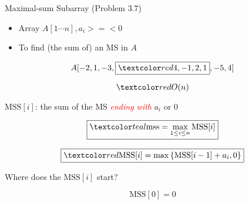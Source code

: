 
\begin{frame}{}
  \begin{exampleblock}{Maximal-sum Subarray (Problem $3.7$)}
    \begin{itemize}
      \item Array $A[1 \cdots n], a_{i} >=< 0$
      \item To find (the sum of) an MS in $A$
    \end{itemize}
	
    \[
      A[-2,1 ,-3, \boxed{\red{4,-1,2,1}} ,-5,4]
    \]
  \end{exampleblock}

  \[
    \red{O(n)}
  \]
\end{frame}

% 
% 
%   

\begin{frame}{}
  \centerline{$\text{MSS}[i]$: the sum of the MS \textcolor{red}{\it ending with} $a_{i}$ or 0}

  \pause
  \vspace{0.30cm}
  \[
    \boxed{\teal{\text{mss} = \max\limits_{1 \le i \le n} \text{MSS}[i]}}
  \]

  \pause
  \vspace{0.30cm}
  \[ 
    \boxed{\red{\text{MSS}[i] = \max \left\{\text{MSS}[i-1] + a_{i}, 0\right\}}}
  \]

  \vspace{0.60cm}
  \centerline{ Where does the $\text{MSS}[i]$ start?}

  \pause
  \vspace{0.30cm}
  \[
    \text{MSS}[0] = 0
  \]

\end{frame}

